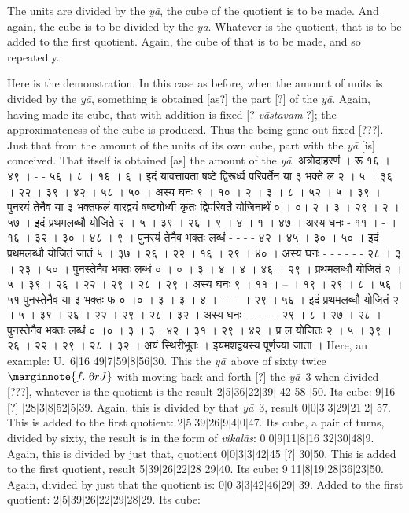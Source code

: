 \documentclass[11pt,a5paper]{book}
\def\ya{\textit{y\=a}}
\def\vikalas{\textit{vi\-ka\-l\=as}}
\def\danda{$|$}
\begin{document}
{The units are divided by the \ya, the cube of the quotient is to be made. And again, the cube is
to be divided by the \ya. Whatever is the quotient, that is to be added to the first quotient. Again,
the cube of that is to be made, and so repeatedly.  

Here is the demonstration. In this case as before, when the amount of units is divided by the \ya, 
something is obtained [as?] the part [?] of the \ya. Again, having made its cube, that with addition
is fixed [? \textit{v\=astava\*m} ?]; the approximateness of the cube is produced. Thus the being
gone-out-fixed [???].  Just that from the amount of the units of its own cube, part with the \ya 
[is] conceived. That itself is obtained [as] the amount of the \ya. 
\newpage
{\s अत्रोदाहरणं । रू १६ । ४९ । - - ५६ । ८ । १६ । ६ । 
इदं यावत्तावता षष्टे द्विरूर्ध्व परिवर्तेन या ३ भक्ते ल २ । ५ । ३६ । २२ । ३९ । ४२ । ५८ । ५० । 
अस्य घनः ९ । १० । २ । ३ । ८ । ५२ । ५ । ३९ । 
पुनरयं तेनैव या ३ भक्तफलं वारद्वयं षष्ट्योर्ध्वी कृतः द्विपरिवर्ते योजिनार्थं ० । ०। २ । ३ । २९ । २ । ५७ । 
इदं प्रथमलब्धौ योजिते २ । ५ । ३९ । २६ ।  ९ । ४ । १ । ४७ । 
अस्य घनः - ११ । - । १६ । ३२ । ३० । ४८ । ९ । 
पुनरयं तेनैव भक्तः लब्धं - - - - ४२ । ४५ । ३० । ५० । 
इदं प्रथमलब्धौ योजितं जातं ५ । ३७ । २६ । २२ । १६ । २९ । ४० । 
अस्य घनः - - - - - - २८ । ३ । २३ । ५० । पुनस्तेनैव भक्तः लब्धं ० । ० । ३ । ४ । ४ । ४६ । २९ । 
प्रथमलब्धौ योजितं २ । ५ । ३९ । २६ । २२ । २९ । २८ । २९ । 
अस्य घनः ९ । ११ । -- । १९ । २९ । ८ । ५६ । ५१ पुनस्तेनैव या ३ भक्तः फ ० ।० । ३ । ३ । ४ । - - - । २९ । ५६ । 
इदं प्रथमलब्धौ योजितं २ । ५ । ३९ । २६ । २२ । २९ । २८ । ३२ । 
अस्य घनः - - - - - २९ । ८ । २७ । २८ । 
पुनस्तेनैव भक्तः लब्धं ० ।० । ३ । ३। ४२ । ३१ । २९ । ४२ । प्र ल योजितः २ । ५ । ३९ । २६ । २२ । २९ । २८ । ३२ । 
अयं स्थिरीभूतः । इयमशद्वयस्य पूर्णज्या जाता ।} 
\newpage
Here, an example: U.\ 6\danda 16  49\danda 7\danda 59\danda 8\danda 56\danda 30. 
This the \ya\ above of sixty twice
$\marginnote{f.~6r J} $
with moving back and forth [?] the \ya\ 3 when divided [???],
whatever is the quotient is the result 2\danda 5\danda 36\danda 22\danda 39\danda
42 58 \danda 50. Its cube: 9\danda 16 [?] \danda 28\danda 3\danda 8\danda 52\danda 5\danda 39.
Again, this is divided by that \ya\ 3, result 0\danda 0\danda 3\danda 3\danda 29\danda 21\danda 2\danda 
57. This is added to the first quotient: 2\danda 5\danda 39\danda 26\danda 9\danda 4\danda 0\danda 47.
Its cube, a pair of turns, divided by sixty, the result is in the form of \vikalas: 
0\danda 0\danda 9\danda 11\danda 8\danda 16 32\danda 30\danda 48\danda 9.
Again, this is divided by just that, quotient 0\danda 0\danda 3\danda 3\danda 42\danda 45 [?]
30\danda 50. This is added to the first quotient, result 5\danda 39\danda 26\danda 22\danda 28
29\danda 40. Its cube: 9\danda 11\danda 8\danda 19\danda 28\danda 36\danda 23\danda 50.
Again, divided by just that the quotient is: 0\danda 0\danda 3\danda 3\danda 42\danda 46\danda 29\danda
39. Added to the first quotient: 2\danda 5\danda 39\danda 26\danda 22\danda 29\danda 28\danda 29. 
Its cube: 

}
\end{document}
